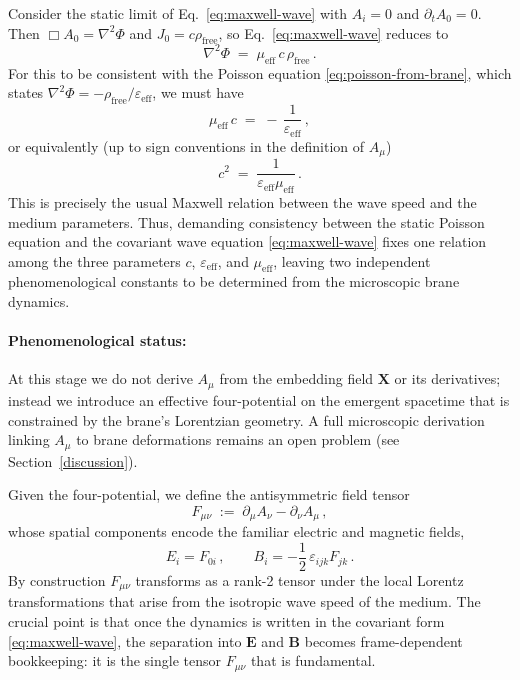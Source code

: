 Consider the static limit of Eq.~\eqref{eq:maxwell-wave} with
$A_i=0$ and $\partial_t A_0 = 0$. Then $\Box A_0 = \nabla^2 \Phi$
and $J_0 = c\rho_{\text{free}}$, so Eq.~\eqref{eq:maxwell-wave} reduces to
\begin{equation}
  \nabla^2 \Phi \;=\; \mu_{\mathrm{eff}}\,c\,\rho_{\text{free}}\,.
  \label{eq:poisson-from-wave-eq}
\end{equation}
For this to be consistent with the Poisson equation
\eqref{eq:poisson-from-brane}, which states
$\nabla^2 \Phi = -\rho_{\text{free}}/\varepsilon_{\mathrm{eff}}$,
we must have
\begin{equation}
  \mu_{\mathrm{eff}}\,c \;=\; -\,\frac{1}{\varepsilon_{\mathrm{eff}}}\,,
  \label{eq:mu-eps-relation}
\end{equation}
or equivalently (up to sign conventions in the definition of $A_\mu$)
\begin{equation}
  c^2 \;=\; \frac{1}{\varepsilon_{\mathrm{eff}}\mu_{\mathrm{eff}}}\,.
  \label{eq:c-squared-relation}
\end{equation}
This is precisely the usual Maxwell relation between the wave speed
and the medium parameters. Thus, demanding consistency between the
static Poisson equation and the covariant wave equation
\eqref{eq:maxwell-wave} fixes one relation among the three parameters
$c$, $\varepsilon_{\mathrm{eff}}$, and $\mu_{\mathrm{eff}}$, leaving
two independent phenomenological constants to be determined from the
microscopic brane dynamics.

\paragraph{Phenomenological status:} At this stage we do not derive $A_\mu$ from the embedding field $\mathbf{X}$ or its derivatives; instead we introduce an effective four-potential on the emergent spacetime that is constrained by the brane's Lorentzian geometry. A full microscopic derivation linking $A_\mu$ to brane deformations remains an open problem (see Section~\ref{discussion}).

Given the four-potential, we define the antisymmetric field tensor
\begin{equation}
  F_{\mu\nu}
  \;:=\;
  \partial_\mu A_\nu - \partial_\nu A_\mu\,,
  \label{eq:Fmunu-def}
\end{equation}
whose spatial components encode the familiar electric and magnetic
fields,
\begin{equation}
  E_i = F_{0i}\,,\qquad
  B_i = -\frac{1}{2}\,\varepsilon_{ijk} F_{jk}\,.
  \label{eq:EB-from-F}
\end{equation}
By construction $F_{\mu\nu}$ transforms as a rank-2 tensor under the
local Lorentz transformations that arise from the isotropic wave speed
of the medium. The crucial point is that once the dynamics is written
in the covariant form \eqref{eq:maxwell-wave}, the separation into
$\mathbf{E}$ and $\mathbf{B}$ becomes frame-dependent bookkeeping:
it is the single tensor $F_{\mu\nu}$ that is fundamental.

